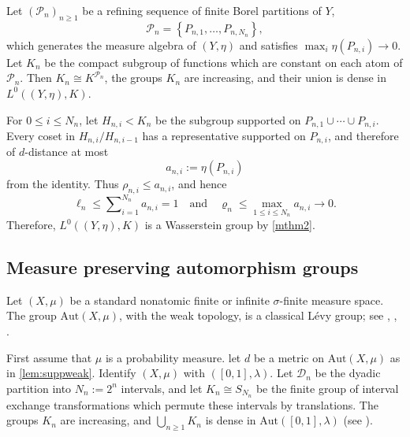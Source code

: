 \documentclass{amsart}
\numberwithin{equation}{subsection}
\theoremstyle{plain}
\theoremstyle{definition}
\theoremstyle{plain}
\begin{document}
\smallskip

Let \(\left(\mathcal{P}_{n}\right)_{n\geq1}\) be a refining sequence of finite Borel partitions of \(Y\),
\[\mathcal{P}_{n}=\left\{P_{n,1},\dotsc,P_{n,N_{n}}\right\},\]
which generates the measure algebra of \(\left(Y,\eta\right)\) and satisfies \(\max_{i}\eta\left(P_{n,i}\right)\to0\). Let \(K_{n}\) be the compact subgroup of functions which are constant on each atom of \(\mathcal{P}_{n}\). Then \(K_{n}\cong K^{\mathcal{P}_{n}}\), the groups \(K_{n}\) are increasing, and their union is dense in \(L^{0}\left(\left(Y,\eta\right),K\right)\).

\smallskip

For \(0\leq i\leq N_{n}\), let \(H_{n,i}<K_{n}\) be the subgroup supported on \(P_{n,1}\cup\dotsm\cup P_{n,i}\). Every coset in \(H_{n,i}/H_{n,i-1}\) has a representative supported on \(P_{n,i}\), and therefore of \(d\)-distance at most
\[a_{n,i}:=\eta\left(P_{n,i}\right)\]
from the identity. Thus \(\rho_{n,i}\leq a_{n,i}\), and hence
\[\ell_{n}\leq\sum\nolimits_{i=1}^{N_{n}}a_{n,i}=1\quad\text{and}\quad\varrho_{n}\leq\max_{1\leq i\leq N_{n}}a_{n,i}\to0.\]
Therefore, \(L^{0}\left(\left(Y,\eta\right),K\right)\) is a Wasserstein group by \cref{mthm2}.

\subsection{Measure preserving automorphism groups}

Let \(\left(X,\mu\right)\) be a standard nonatomic finite or infinite \(\sigma\)-finite measure space. The group \(\mathrm{Aut}\left(X,\mu\right)\), with the weak topology, is a classical L\'{e}vy group; see \cite[\S1]{glasner2005automorphism}, \cite[\S4.5]{Pestov2006}, \cite[Thm.~4.2]{giordano2007some}.

\smallskip

First assume that \(\mu\) is a probability measure. let \(d\) be a metric on \(\mathrm{Aut}\left(X,\mu\right)\) as in \cref{lem:suppweak}. Identify \(\left(X,\mu\right)\) with \(\left(\left[0,1\right],\lambda\right)\). Let \(\mathcal{D}_{n}\) be the dyadic partition into \(N_{n}:=2^{n}\) intervals, and let \(K_{n}\cong S_{N_{n}}\) be the finite group of interval exchange transformations which permute these intervals by translations. The groups \(K_{n}\) are increasing, and \(\bigcup_{n\geq1}K_{n}\) is dense in \(\mathrm{Aut}\left(\left[0,1\right],\lambda\right)\) (see \cite[Thm.~4.1]{giordano2007some}).

\smallskip
\end{document}
